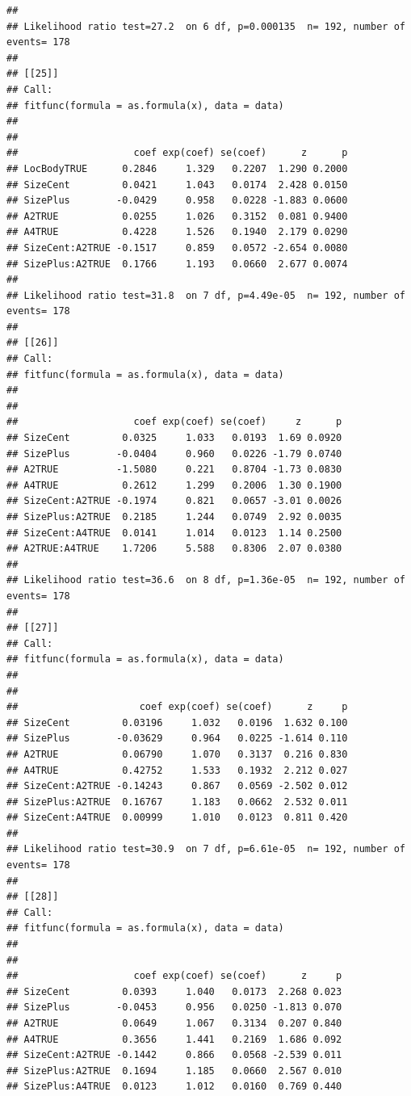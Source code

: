 \documentclass{article}\usepackage[]{graphicx}\usepackage[]{color}
\makeatletter
\newenvironment{kframe}{%
 \def\at@end@of@kframe{}%
 \ifinner\ifhmode%
  \def\at@end@of@kframe{\end{minipage}}%
  \begin{minipage}{\columnwidth}%
 \fi\fi%
 \def\FrameCommand##1{\hskip\@totalleftmargin \hskip-\fboxsep
 \colorbox{shadecolor}{##1}\hskip-\fboxsep
     \hskip-\linewidth \hskip-\@totalleftmargin \hskip\columnwidth}%
 \MakeFramed {\advance\hsize-\width
   \@totalleftmargin\z@ \linewidth\hsize
   \@setminipage}}%
 {\par\unskip\endMakeFramed%
 \at@end@of@kframe}
\newenvironment{knitrout}{}{} %
\makeatother
\begin{document}
\begin{knitrout}
\begin{kframe}
\begin{verbatim}
## 
## Likelihood ratio test=27.2  on 6 df, p=0.000135  n= 192, number of events= 178 
## 
## [[25]]
## Call:
## fitfunc(formula = as.formula(x), data = data)
## 
## 
##                    coef exp(coef) se(coef)      z      p
## LocBodyTRUE      0.2846     1.329   0.2207  1.290 0.2000
## SizeCent         0.0421     1.043   0.0174  2.428 0.0150
## SizePlus        -0.0429     0.958   0.0228 -1.883 0.0600
## A2TRUE           0.0255     1.026   0.3152  0.081 0.9400
## A4TRUE           0.4228     1.526   0.1940  2.179 0.0290
## SizeCent:A2TRUE -0.1517     0.859   0.0572 -2.654 0.0080
## SizePlus:A2TRUE  0.1766     1.193   0.0660  2.677 0.0074
## 
## Likelihood ratio test=31.8  on 7 df, p=4.49e-05  n= 192, number of events= 178 
## 
## [[26]]
## Call:
## fitfunc(formula = as.formula(x), data = data)
## 
## 
##                    coef exp(coef) se(coef)     z      p
## SizeCent         0.0325     1.033   0.0193  1.69 0.0920
## SizePlus        -0.0404     0.960   0.0226 -1.79 0.0740
## A2TRUE          -1.5080     0.221   0.8704 -1.73 0.0830
## A4TRUE           0.2612     1.299   0.2006  1.30 0.1900
## SizeCent:A2TRUE -0.1974     0.821   0.0657 -3.01 0.0026
## SizePlus:A2TRUE  0.2185     1.244   0.0749  2.92 0.0035
## SizeCent:A4TRUE  0.0141     1.014   0.0123  1.14 0.2500
## A2TRUE:A4TRUE    1.7206     5.588   0.8306  2.07 0.0380
## 
## Likelihood ratio test=36.6  on 8 df, p=1.36e-05  n= 192, number of events= 178 
## 
## [[27]]
## Call:
## fitfunc(formula = as.formula(x), data = data)
## 
## 
##                     coef exp(coef) se(coef)      z     p
## SizeCent         0.03196     1.032   0.0196  1.632 0.100
## SizePlus        -0.03629     0.964   0.0225 -1.614 0.110
## A2TRUE           0.06790     1.070   0.3137  0.216 0.830
## A4TRUE           0.42752     1.533   0.1932  2.212 0.027
## SizeCent:A2TRUE -0.14243     0.867   0.0569 -2.502 0.012
## SizePlus:A2TRUE  0.16767     1.183   0.0662  2.532 0.011
## SizeCent:A4TRUE  0.00999     1.010   0.0123  0.811 0.420
## 
## Likelihood ratio test=30.9  on 7 df, p=6.61e-05  n= 192, number of events= 178 
## 
## [[28]]
## Call:
## fitfunc(formula = as.formula(x), data = data)
## 
## 
##                    coef exp(coef) se(coef)      z     p
## SizeCent         0.0393     1.040   0.0173  2.268 0.023
## SizePlus        -0.0453     0.956   0.0250 -1.813 0.070
## A2TRUE           0.0649     1.067   0.3134  0.207 0.840
## A4TRUE           0.3656     1.441   0.2169  1.686 0.092
## SizeCent:A2TRUE -0.1442     0.866   0.0568 -2.539 0.011
## SizePlus:A2TRUE  0.1694     1.185   0.0660  2.567 0.010
## SizePlus:A4TRUE  0.0123     1.012   0.0160  0.769 0.440

\end{verbatim}
\end{kframe}
\end{knitrout}
\end{document}
